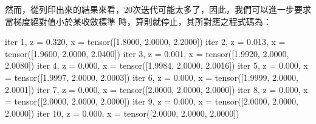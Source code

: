 \documentclass[letterpaper,10pt,english]{sphinxmanual}
\begin{document}
然而，從列印出來的結果來看，20次迭代可能太多了，因此，我們可以進一步要求當梯度絕對值小於某收斂標準  時，算則就停止，其所對應之程式碼為：

\begin{sphinxVerbatim}[commandchars=\\\{\}]
  
  
  \PYG{p}{[}  \PYG{p}{]}
                   
  
   
     
          
      
            
       
\end{sphinxVerbatim}

\begin{sphinxVerbatim}[commandchars=\\\{\}]
iter  1, z = 0.320, x = tensor([1.8000, 2.0000, 2.2000])
iter  2, z = 0.013, x = tensor([1.9600, 2.0000, 2.0400])
iter  3, z = 0.001, x = tensor([1.9920, 2.0000, 2.0080])
iter  4, z = 0.000, x = tensor([1.9984, 2.0000, 2.0016])
iter  5, z = 0.000, x = tensor([1.9997, 2.0000, 2.0003])
iter  6, z = 0.000, x = tensor([1.9999, 2.0000, 2.0001])
iter  7, z = 0.000, x = tensor([2.0000, 2.0000, 2.0000])
iter  8, z = 0.000, x = tensor([2.0000, 2.0000, 2.0000])
iter  9, z = 0.000, x = tensor([2.0000, 2.0000, 2.0000])
iter 10, z = 0.000, x = tensor([2.0000, 2.0000, 2.0000])
\end{sphinxVerbatim}
\end{document}
